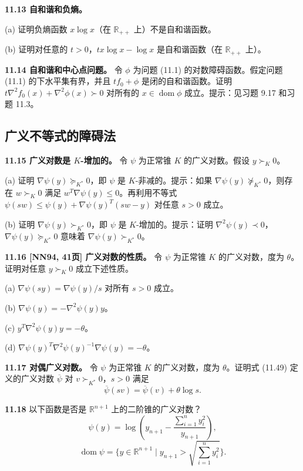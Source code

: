 \documentclass[UTF8, 12pt, fontset=fandol, oneside]{ctexart}
\begin{document}
\noindent\textbf{11.13 自和谐和负熵。}

(a) 证明负熵函数 $x\log x$（在 $\mathbb{R}_{++}$ 上）不是自和谐函数。

(b) 证明对任意的 $t>0$，$tx\log x-\log x$ 是自和谐函数（在 $\mathbb{R}_{++}$ 上）。

\noindent\textbf{11.14 自和谐和中心点问题。} 令 $\phi$ 为问题 (11.1) 的对数障碍函数。假定问题 (11.1) 的下水平集有界，并且 $tf_0+\phi$ 是闭的自和谐函数。证明 $t\nabla^2 f_0(x)+\nabla^2\phi(x)\succ 0$ 对所有的 $x\in\operatorname{dom}\phi$ 成立。提示：见习题 9.17 和习题 11.3。

\subsection*{广义不等式的障碍法}

\noindent\textbf{11.15 广义对数是 $K$-增加的。} 令 $\psi$ 为正常锥 $K$ 的广义对数。假设 $y\succ_K 0$。

(a) 证明 $\nabla\psi(y)\succeq_{K^\ast} 0$，即 $\psi$ 是 $K$-非减的。提示：如果 $\nabla\psi(y)\not\succeq_{K^\ast}0$，则存在 $w\succ_K 0$ 满足 $w^T\nabla\psi(y)\leq 0$。再利用不等式 $\psi(sw)\leq \psi(y)+\nabla\psi(y)^T(sw-y)$ 对任意 $s>0$ 成立。

(b) 证明 $\nabla\psi(y)\succ_{K^\ast}0$，即 $\psi$ 是 $K$-增加的。提示：证明 $\nabla^2\psi(y)\prec 0$，$\nabla\psi(y)\succeq_{K^\ast}0$ 意味着 $\nabla\psi(y)\succ_{K^\ast}0$。

\noindent\textbf{11.16 [NN94, 41页] 广义对数的性质。} 令 $\psi$ 为正常锥 $K$ 的广义对数，度为 $\theta$。证明对任意 $y\succ_K0$ 成立下述性质。

(a) $\nabla\psi(sy)=\nabla\psi(y)/s$ 对所有 $s>0$ 成立。

(b) $\nabla\psi(y)=-\nabla^2\psi(y)y$。

(c) $y^T\nabla^2\psi(y)y=-\theta$。

(d) $\nabla\psi(y)^T\nabla^2\psi(y)^{-1}\nabla\psi(y)=-\theta$。

\noindent\textbf{11.17 对偶广义对数。} 令 $\psi$ 为正常锥 $K$ 的广义对数，度为 $\theta$。证明式 (11.49) 定义的广义对数 $\overline{\psi}$ 对 $v\succ_{K^\ast}0$，$s>0$ 满足
\[
\overline{\psi}(sv)=\overline{\psi}(v)+\theta\log s.
\]

\noindent\textbf{11.18} 以下函数是否是 $\mathbb{R}^{n+1}$ 上的二阶锥的广义对数？
\[
\psi(y)=\log\left(y_{n+1}-\frac{\sum_{i=1}^n y_i^2}{y_{n+1}}\right),
\]
\[
\operatorname{dom}\psi=\{y\in\mathbb{R}^{n+1}\mid y_{n+1}>\sqrt{\sum_{i=1}^n y_i^2}\}.
\]
\end{document}
